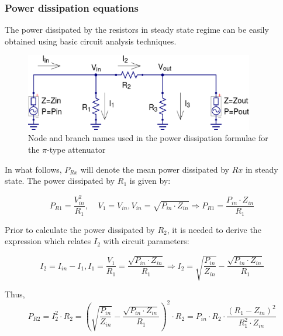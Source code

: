\subsubsection{Power dissipation equations}

The power dissipated by the resistors in steady state regime can be easily obtained using basic circuit analysis techniques.

\begin{figure}[ht]
\begin{center}
\includegraphics[width=10cm]{bitmaps/synthesis/attenuators/Pi-Type-Power-Dissipation}
\end{center}
\caption{Node and branch names used in the power dissipation formulae for the $\pi$-type attenuator}
\label{fig:pi_attenuator_power_dissipation}
\end{figure}
\FloatBarrier

\noindent In what follows, $P_{Rx}$ will denote the mean power dissipated by $Rx$ in steady state. The power dissipated by $R_1$ is given by:

\begin{equation}
P_{R1} = \dfrac{V_{in}^2}{R_{1}}, \;\;\;\; V_{1} = V_{in}, V_{in} = \sqrt{P_{in}\cdot Z_{in}}  \Rightarrow P_{R1} = \dfrac{P_{in} \cdot Z_{in}}{R_{1}}
\end{equation}

\noindent Prior to calculate the power dissipated by $R_2$, it is needed to derive the expression which relates $I_{2}$ with circuit parameters:

\begin{equation}
I_{2} = I_{in} - I_{1}, I_{1} = \dfrac{V_{1}}{R_{1}} = \dfrac{\sqrt{P_{in} \cdot Z_{in}}}{R_{1}} \Rightarrow I_{2} = \sqrt{\dfrac{P_{in}}{Z_{in}}} - \dfrac{\sqrt{P_{in} \cdot Z_{in}}}{R_{1}}
\end{equation}

\noindent Thus,
\begin{equation}
P_{R2} = I_{2}^2 \cdot R_{2} = \left( \sqrt{\dfrac{P_{in}}{Z_{in}}} - \dfrac{\sqrt{P_{in} \cdot Z_{in}}}{R_{1}} \right)^2 \cdot R_{2} = P_{in} \cdot R_{2} \cdot \dfrac{(R_{1} - Z_{in})^2}{R_{1}^2 \cdot Z_{in}}
\end{equation}


